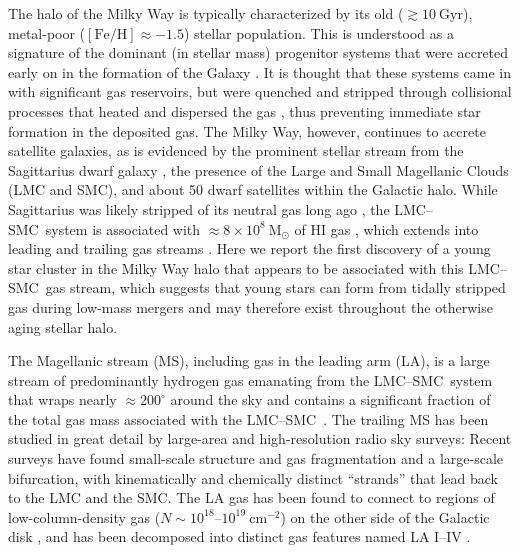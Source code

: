 \documentclass[twocolumn]{aastex62}
\newcommand{\msun}{\textrm{M}_\odot}
\newcommand{\feh}{\ensuremath{[\textrm{Fe} / \textrm{H}]}}
\newcommand{\hi}{H{\footnotesize I} }
\newcommand{\lmcsmc}{LMC--SMC}
\begin{document}
The halo of the Milky Way is typically characterized by its old ($\gtrsim 10~\textrm{Gyr}$), metal-poor ($\feh \approx -1.5$) stellar population.
This is understood as a signature of the dominant (in stellar mass) progenitor systems that were accreted early on in the formation of the Galaxy \citep[massive dwarf galaxies][]{Deason:2015, Fiorentino:2015}.
It is thought that these systems came in with significant gas reservoirs, but were quenched and stripped through collisional processes that heated and dispersed the gas \citep[e.g.,][]{Mayer:2006}, thus preventing immediate star formation in the deposited gas.
The Milky Way, however, continues to accrete satellite galaxies, as is evidenced by the prominent stellar stream from the Sagittarius dwarf galaxy \citep{Ibata:1994, Majewski:2003}, the presence of the Large and Small Magellanic Clouds (LMC and SMC), and about 50 dwarf satellites within the Galactic halo.
While Sagittarius was likely stripped of its neutral gas long ago \citep{Burton:1999, Tepper-Garcia:2018}, the \lmcsmc\ system is associated with $\approx 8\times 10^8~\msun$ of \hi gas \citep{Bruns:2005}, which extends into leading and trailing gas streams \citep{Mathewson:1974, Putman:1998, Bruns:2005, Nidever:2010}.
Here we report the first discovery of a young star cluster in the Milky Way halo that appears to be associated with this \lmcsmc\ gas stream, which suggests that young stars can form from tidally stripped gas during low-mass mergers and may therefore exist throughout the otherwise aging stellar halo.

The Magellanic stream (MS), including gas in the leading arm (LA), is a large stream of predominantly hydrogen gas emanating from the \lmcsmc\ system that wraps nearly $\approx 200^\circ$ around the sky \citep{Mathewson:1974, Putman:1998, Bruns:2005, Nidever:2010} and contains a significant fraction of the total gas mass associated with the \lmcsmc\ \citep{Bruns:2005}.
The trailing MS has been studied in great detail by large-area and high-resolution radio sky surveys: Recent surveys have found small-scale structure and gas fragmentation \citep[e.g.,][]{Nidever:2008, For:2014} and a large-scale bifurcation, with kinematically \citep{Nidever:2008} and chemically \citep{Fox:2013} distinct ``strands'' that lead back to the LMC and the SMC.
The LA gas has been found to connect to regions of low-column-density gas ($N\sim 10^{18}$--$10^{19}~\textrm{cm}^{-2}$) on the other side of the Galactic disk \citep{Putman:1998, Nidever:2008}, and has been decomposed into distinct gas features named LA I--IV \citep{Bruns:2005, Nidever:2008, Venzmer:2012}.
\end{document}
